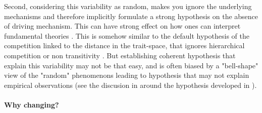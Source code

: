 Second, considering this variability as random, makes you ignore the underlying mechanisms and therefore implicitly formulate a strong hypothesis on the absence of driving mechanism. This can have strong effect on how ones can interpret fundamental theories \parencite{turcotte_phenotypic_2016}. This is somehow similar to the default hypothesis of the competition linked to the distance in the trait-space, that ignores hierarchical competition \parencite{kunstler_plant_2016} or non transitivity \parencite{levine_beyond_2017}. But establishing coherent hypothesis that explain this variability may not be that easy, and is often biased by a "bell-shape" view of the "random" phenomenons leading to hypothesis  that may not explain empirical observations (see the discusion in \citet{kichenin_contrasting_2013} around the hypothesis developed in \citet{albert_intraspecific_2010}).


%
%

\paragraph{Why changing?}

